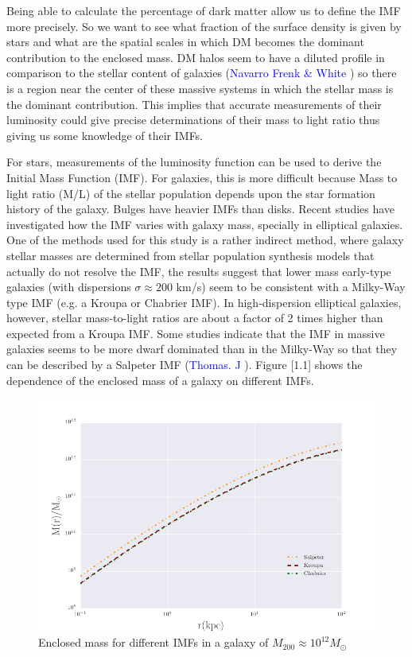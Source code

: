 Being able to calculate the percentage of dark matter allow us to define the IMF more precisely. So we want to see what fraction of the surface density is given by stars and what are the spatial scales in which DM becomes the dominant contribution to the enclosed mass. DM halos seem to have a diluted profile in comparison to the stellar content of galaxies (\textcolor{blue}{Navarro Frenk \& White} \citeyear{Reference17}) so there is a region near the center of these massive systems in which the stellar mass is the dominant contribution. This implies that accurate measurements of their luminosity could give precise determinations of their mass to light ratio thus giving us some knowledge of their IMFs.

For stars, measurements of the luminosity function can be used to derive the Initial Mass Function (IMF). For galaxies, this is more difficult because Mass to light ratio (M/L) of the stellar population depends upon the star formation history of the galaxy. Bulges have heavier IMFs than disks. Recent studies have investigated how the IMF varies with galaxy mass, specially in elliptical galaxies. One of the methods used for this study is a rather indirect method, where galaxy stellar masses are determined from stellar population synthesis models that actually do not resolve the IMF, the results suggest that lower mass early-type galaxies (with dispersions $\sigma \approx 200$ km/s) seem to be consistent with a Milky-Way type IMF (e.g. a Kroupa or Chabrier IMF). In high-dispersion elliptical galaxies, however, stellar mass-to-light ratios are about a factor of 2 times higher than expected from a Kroupa IMF. Some studies indicate that the IMF in massive galaxies seems to be more dwarf dominated than in the Milky-Way so that they can be described by a Salpeter IMF (\textcolor{blue}{Thomas. J} \citeyear{Reference28}). Figure [1.1] shows the dependence of the enclosed mass of a galaxy on different IMFs.

\begin{figure}[H]
\centering
\includegraphics[width=12cm]{images/Enclosed_Mass_IMFs.png}
\caption[Enclosed mass for different IMFs in a galaxy]{Enclosed mass for different IMFs in a galaxy of $M_{200}\approx 10^{12} M_{\odot}$}
\end{figure}   

